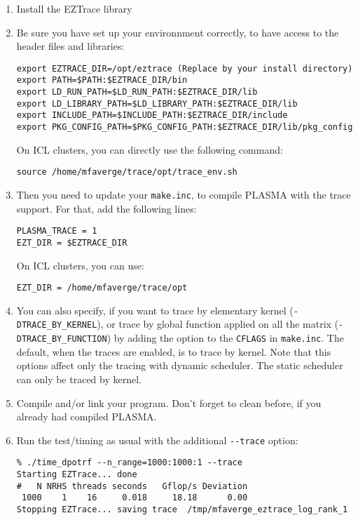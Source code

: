 \begin{enumerate}
\item Install the {\sc EZTrace} library
\item Be sure you have set up your environnment correctly, to have
  access to the header files and libraries:
\begin{verbatim}
export EZTRACE_DIR=/opt/eztrace (Replace by your install directory)
export PATH=$PATH:$EZTRACE_DIR/bin
export LD_RUN_PATH=$LD_RUN_PATH:$EZTRACE_DIR/lib
export LD_LIBRARY_PATH=$LD_LIBRARY_PATH:$EZTRACE_DIR/lib
export INCLUDE_PATH=$INCLUDE_PATH:$EZTRACE_DIR/include
export PKG_CONFIG_PATH=$PKG_CONFIG_PATH:$EZTRACE_DIR/lib/pkg_config
\end{verbatim}

On ICL clusters, you can directly use the following command:
\begin{verbatim}
source /home/mfaverge/trace/opt/trace_env.sh
\end{verbatim}

\item Then you need to update your \texttt{make.inc}, to compile {\sc
  PLASMA} with the trace support. For that, add the following lines:
\begin{verbatim}
PLASMA_TRACE = 1
EZT_DIR = $EZTRACE_DIR
\end{verbatim}

On ICL clusters, you can use:
\begin{verbatim}
EZT_DIR = /home/mfaverge/trace/opt
\end{verbatim}

\item You can also specify, if you want to trace by elementary kernel
  (\verb+-DTRACE_BY_KERNEL+), or trace by global function applied on
  all the matrix (\verb+-DTRACE_BY_FUNCTION+) by adding the option to
  the \verb+CFLAGS+ in  \texttt{make.inc}. The default, when the
  traces are enabled, is to trace by kernel.
  Note that this options affect only the tracing with dynamic
  scheduler. The static scheduler can only be traced by kernel.

\item Compile and/or link your program. Don't forget to clean before,
  if you already had compiled {\sc PLASMA}.

\item Run the test/timing as usual with the additional \verb+--trace+ option:
\begin{verbatim}
% ./time_dpotrf --n_range=1000:1000:1 --trace
Starting EZTrace... done
#   N NRHS threads seconds   Gflop/s Deviation
 1000    1    16     0.018     18.18      0.00
Stopping EZTrace... saving trace  /tmp/mfaverge_eztrace_log_rank_1
\end{verbatim}


\end{enumerate}
